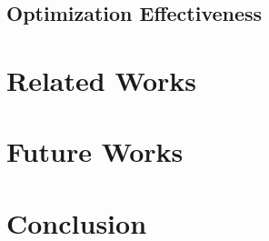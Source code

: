 \documentclass[10pt,sigconf,letterpaper,anonymous,nonacm]{acmart}
\begin{document}
\subsection{Optimization Effectiveness}



\section{Related Works}

\section{Future Works}

\section{Conclusion}



\end{document}
